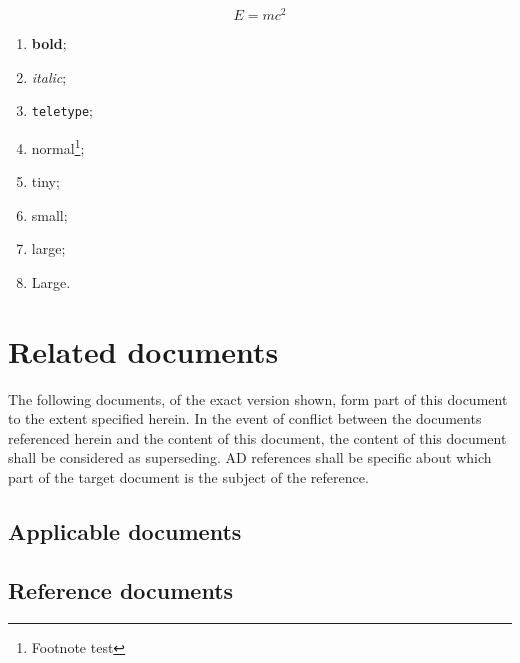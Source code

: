 \documentclass[12pt,a4paper]{article}
\begin{document}
\begin{equation}
  \label{eq:eq}
  E = mc^2
\end{equation}

\begin{enumerate}
\item {\bf bold};
\item {\it italic};
\item {\tt teletype};
\item normal\footnote{Footnote test};
\item {\tiny tiny};
\item {\small small};
\item {\large large};
\item {\Large Large}.
\end{enumerate}


\section{Related documents}

The following documents, of the exact version shown, form part of this document to the extent specified herein. In the event of conflict between the documents referenced herein and the content of this document, the content of this document shall be considered as superseding.  AD references shall be specific about which part of the target document is the subject of the reference.

\subsection{Applicable documents}
\begin{ADlist}
\end{ADlist}


\subsection{Reference documents}
\begin{RDlist}
\end{RDlist}
\end{document}
